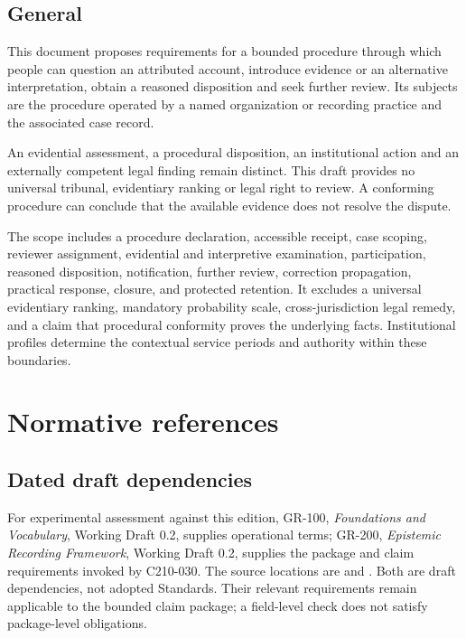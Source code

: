 \documentclass[11pt,a4paper]{article}
\begin{document}
\subsection{General}

This document proposes requirements for a bounded procedure through which people can question an attributed account, introduce evidence or an alternative interpretation, obtain a reasoned disposition and seek further review. Its subjects are the procedure operated by a named organization or recording practice and the associated case record.

An evidential assessment, a procedural disposition, an institutional action and an externally competent legal finding remain distinct. This draft provides no universal tribunal, evidentiary ranking or legal right to review. A conforming procedure can conclude that the available evidence does not resolve the dispute.

The scope includes a procedure declaration, accessible receipt, case scoping, reviewer assignment, evidential and interpretive examination, participation, reasoned disposition, notification, further review, correction propagation, practical response, closure, and protected retention. It excludes a universal evidentiary ranking, mandatory probability scale, cross-jurisdiction legal remedy, and a claim that procedural conformity proves the underlying facts. Institutional profiles determine the contextual service periods and authority within these boundaries.

\section{Normative references}
\subsection{Dated draft dependencies}
For experimental assessment against this edition, GR-100, \emph{Foundations and Vocabulary}, Working Draft 0.2, supplies operational terms; GR-200, \emph{Epistemic Recording Framework}, Working Draft 0.2, supplies the package and claim requirements invoked by C210-030. The source locations are  and . Both are draft dependencies, not adopted Standards. Their relevant requirements remain applicable to the bounded claim package; a field-level check does not satisfy package-level obligations.
\end{document}
